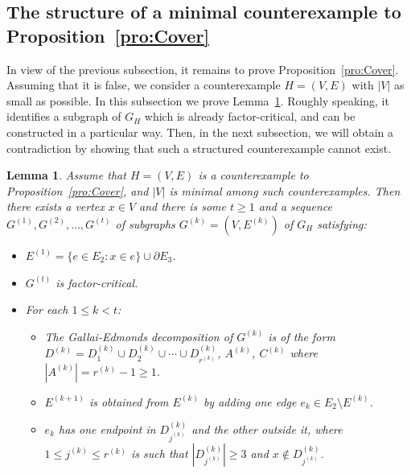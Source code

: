\documentclass[10pt,a4paper]{amsart}
\newtheorem{lemma}[theorem]{Lemma}
\begin{document}
\subsection{The structure of a minimal counterexample to Proposition~\ref{pro:Cover}}
In view of the previous subsection, it remains to prove Proposition~\ref{pro:Cover}. Assuming that it is false, we consider a counterexample $H = (V, E)$ with $|V|$ as small as possible. In this subsection we prove Lemma~\ref{lem:Cons}. Roughly speaking, it identifies a subgraph of $G_H$ which is already factor-critical, and can be constructed in a particular way. Then, in the next subsection, we will obtain a contradiction by showing that such a structured counterexample cannot exist.
\begin{lemma} \label{lem:Cons}
Assume that $H = (V, E)$ is a counterexample to Proposition~\ref{pro:Cover}, and $|V|$ is minimal among such counterexamples. Then there exists a vertex $x \in V$ and there is some $t \ge 1$ and a sequence $G^{(1)}, G^{(2)}, \ldots , G^{(t)}$ of subgraphs $G^{(k)} = (V, E^{(k)})$ of $G_H$ satisfying:
\begin{itemize}
    \item[(a)] $E^{(1)} = \{e \in E_2: x \in e\} \cup \partial E_3$.
    \item[(b)] $G^{(t)}$ is factor-critical.
    \item[(c)] For each $1 \le k < t$: \begin{itemize}
        \item[(c1)] The Gallai-Edmonds decomposition of $G^{(k)}$ is of the form $D^{(k)} = D_1^{(k)} \cup D_2^{(k)} \cup \cdots \cup D_{r^{(k)}}^{(k)}$, $A^{(k)}$, $C^{(k)}$ where $|A^{(k)}| = r^{(k)} - 1 \ge 1$.
        \item[(c2)] $E^{(k+1)}$ is obtained from $E^{(k)}$ by adding one edge $e_k \in E_2 \setminus E^{(k)}$.
        \item[(c3)] $e_k$ has one endpoint in $D_{j^{(k)}}^{(k)}$ and the other outside it, where $1 \le j^{(k)} \le r^{(k)}$ is such that $|D_{j^{(k)}}^{(k)}| \ge 3$ and $x \notin D_{j^{(k)}}^{(k)}$.
        \end{itemize}
    \end{itemize}
\end{lemma}
\end{document}
